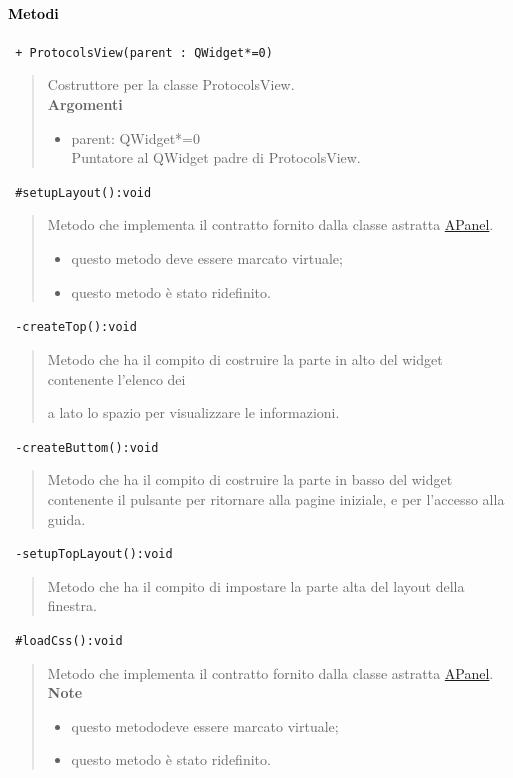 \paragraph{\textcolor{black}{Metodi\\}}
\color{blue}\verb! + ProtocolsView(parent : QWidget*=0)!
\begin{quote}
\color{black}Costruttore per la classe ProtocolsView. \\
\textbf{Argomenti}
\begin{itemize}
\item parent: QWidget*=0  \\ Puntatore al QWidget padre di ProtocolsView.
\end{itemize}
\end{quote}
\color{blue}\verb! #setupLayout():void!
\begin{quote}
\color{black} Metodo che implementa il contratto fornito dalla classe astratta \hyperref[speAPanel]{APanel}.
\begin{itemize}
\item questo metodo deve essere marcato virtuale;
\item questo metodo è stato ridefinito.
\end{itemize}
\end{quote} 
\color{blue}\verb! -createTop():void!
\begin{quote}
\color{black} Metodo che ha il compito di costruire la parte in alto del widget contenente l'elenco dei \subject e a lato lo spazio per visualizzare le informazioni.
\end{quote} 
\color{blue}\verb! -createButtom():void!
\begin{quote}
\color{black} Metodo che ha il compito di costruire la parte in basso del widget contenente il pulsante per ritornare alla pagine iniziale, e per l'accesso alla guida.
\end{quote}
\color{blue}\verb! -setupTopLayout():void!
\begin{quote}
\color{black} Metodo che ha il compito di impostare la parte alta del layout della finestra.
\end{quote}  
\color{blue}\verb! #loadCss():void!
\begin{quote}
\color{black} Metodo che implementa il contratto fornito dalla classe astratta \hyperref[speAPanel]{APanel}.\\
 \textbf{Note}
 \begin{itemize}
  \item questo metododeve essere marcato virtuale;
 \item questo metodo è stato ridefinito.
 \end{itemize}
\end{quote} 

